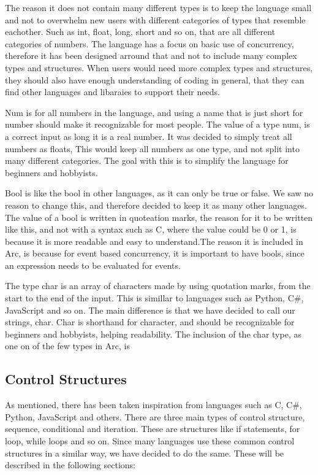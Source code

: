 The reason it does not contain many different types is to keep the language small and not to overwhelm new users with different categories of types that resemble eachother. Such as int, float, long, short and so on, that are all different categories of numbers. The language has a focus on basic use of concurrency, therefore it has been designed arround that and not to include many complex types and structures. When users would need more complex types and structures, they should also have enough understanding of coding in general, that they can find other languages and libaraies to support their needs.

Num is for all numbers in the language, and using a name that is just short for number should make it recognizable for most people. The value of a type num, is a correct input as long it is a real number. It was decided to simply treat all numbers as floats, This would keep all numbers as one type, and not split into many different categories. The goal with this is to simplify the language for beginners and hobbyists.

Bool is like the bool in other languages, as it can only be true or false. We saw no reason to change this, and therefore decided to keep it as many other languages. The value of a bool is written in quoteation marks, the reason for it to be written like this, and not with a syntax such as C, where the value could be 0 or 1, is because it is more readable and easy to understand.The reason it is included in Arc, is because for event based concurrency, it is important to have bools, since an expression needs to be evaluated for events.

The type char is an array of characters made by using quotation marks, from the start to the end of the input.  This is simillar to languages such as Python, C\#, JavaScript and so on. The main difference is that we have decided to call our strings, char. Char is shorthand for character, and should be recognizable for beginners and hobbyists, helping readability. The inclusion of the char type, as one on of the few types in Arc, is 
 
\subsection{Control Structures}
As mentioned, there has been taken inspiration from languages such as C, C\#, Python, JavaScript and others. There are three main types of control structure, sequence, conditional and iteration. These are structures like if statements, for loop, while loops and so on. Since many languages use these common control structures in a similar way, we have decided to do the same. These will be described in the following sections:

